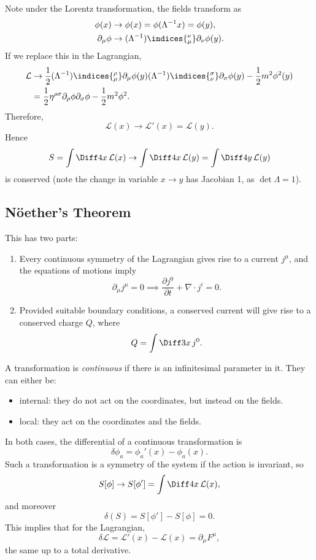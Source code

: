 \documentclass[12pt]{article}
\begin{document}

Note under the Lorentz transformation, the fields transform as
\begin{align*}
	\phi(x) &\to \phi(x) = \phi(\Lambda^{-1}x) = \phi(y), \\
	\partial_\mu \phi &\to (\Lambda^{-1})\indices{^{\nu}_{\mu}} \partial_\nu \phi(y).
\end{align*}
If we replace this in the Lagrangian,
\begin{align*}
	\mathcal{L} &\to \frac{1}{2}(\Lambda^{-1})\indices{^{\rho}_{\mu}} \partial_\mu \phi(y) (\Lambda^{-1})\indices{^{\sigma}_{\nu}} \partial_\sigma \phi(y) - \frac{1}{2} m^2 \phi^2(y) \\
		    &= \frac{1}{2} \eta^{\rho\sigma} \partial_\rho \phi \partial_\sigma \phi - \frac{1}{2} m^2 \phi^2.
\end{align*}
Therefore,
\[
\mathcal{L}(x) \to \mathcal{L}'(x) = \mathcal{L}(y).
\]
Hence
\[
S = \int \Diff4 x \, \mathcal{L}(x) \to \int \Diff4 x \, \mathcal{L}(y) = \int \Diff4 y\, \mathcal{L}(y)
\]
is conserved (note the change in variable $x \to y$ has Jacobian 1, as $\det \Lambda = 1$).

\subsection{N\"oether's Theorem}%
\label{sub:nt}

This has two parts:
\begin{enumerate}
	\item Every continuous symmetry of the Lagrangian gives rise to a current $j^\mu$, and the equations of motions imply
		\[
		\partial_\mu j^\mu = 0 \implies \frac{\partial j^0}{\partial t} + \nabla \cdot j^i = 0.
		\]
	\item Provided suitable boundary conditions,  a conserved current will give rise to a conserved charge $Q$, where
		\[
		Q = \int \Diff 3x \,j^0.
		\]
\end{enumerate}

\begin{definition}
	A transformation is \emph{continuous} if there is an infinitesimal parameter in it. They can either be:
	\begin{itemize}
		\item internal: they do not act on the coordinates, but instead on the fields.
		\item local: they act on the coordinates and the fields.
	\end{itemize}
	In both cases, the differential of a continuous transformation is
	\[
	\delta \phi_a = \phi_a'(x) - \phi_a(x).
	\]
	Such a transformation is a symmetry of the system if the action is invariant, so
	\[
	S[\phi] \to S[\phi'] = \int \Diff4 x\, \mathcal{L}(x),
	\]
	and moreover
	\[
		\delta(S) = S[\phi'] - S[\phi] = 0.
	\]
	This implies that for the Lagrangian,
	\[
	\delta \mathcal{L} = \mathcal{L}'(x) - \mathcal{L}(x) = \partial_\mu F^\mu,
	\]
	the same up to a total derivative.
\end{definition}
\end{document}
